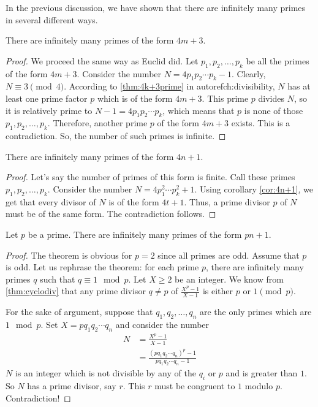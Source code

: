 \documentclass{subfiles}
\begin{document}
	In the previous discussion, we have shown that there are infinitely many primes in several different ways.
		\begin{theorem}
			There are infinitely many primes of the form $4m+3$.
		\end{theorem}

		\begin{proof}
			We proceed the same way as Euclid did. Let $p_1,p_2,\ldots,p_k$ be all the primes of the form $4m+3$. Consider the number $N=4p_1p_2\cdots p_k-1$. Clearly, $N\equiv3\pmod4$. According to \autoref{thm:4k+3prime} in autoref{ch:divisibility}, $N$ has at least one prime factor $p$ which is of the form $4m+3$. This prime $p$ divides $N$, so it is relatively prime to $N-1=4p_1p_2\cdots p_k$, which means that $p$ is none of those $p_1,p_2,\ldots,p_k$. Therefore, another prime $p$ of the form $4m+3$ exists. This is a contradiction. So, the number of such primes is infinite.
		\end{proof}

		\begin{theorem}
			There are infinitely many primes of the form $4n+1$.
		\end{theorem}

		\begin{proof}
			Let's say the number of primes of this form is finite. Call these primes $p_1,p_2,\ldots,p_k$. Consider the number $N=4p_1^2\cdots p_k^2+1$. Using corollary \eqref{cor:4n+1}, we get that every divisor of $N$ is of the form $4t+1$. Thus, a prime divisor $p$ of $N$ must be of the same form. The contradiction follows.
		\end{proof}

		\begin{theorem}
			Let $p$ be a prime. There are infinitely many primes of the form $pn+1$.
		\end{theorem}

		\begin{proof}
			The theorem is obvious for $p=2$ since all primes are odd. Assume that $p$ is odd. Let us rephrase the theorem: for each prime $p$, there are infinitely many primes $q$ such that $q\equiv1\mod{p}$. Let $X \geq 2$ be an integer. We know from \autoref{thm:cyclodiv} that any prime divisor $q \neq p$ of $\frac{X^{p}-1}{X-1}$ is either $p$ or $1 \pmod p$.

			For the sake of argument, suppose that $q_{1},q_{2},\ldots,q_{n}$ are the only primes which are $1\mod{p}$. Set $X=pq_{1}q_{2}\cdots q_{n}$ and consider the number
				\begin{align*}
					N & =\frac{X^{p}-1}{X-1}\\
					  & = \frac{(pq_1q_2\cdots q_n)^p-1}{pq_1q_2\cdots q_n-1}
				\end{align*}
			$N$ is an integer which is not divisible by any of the $q_{i}$ or $p$ and is greater than $1$. So $N$ has a prime divisor, say $r$. This $r$ must be congruent to $1$ modulo $p$. Contradiction!
		\end{proof}
\end{document}
